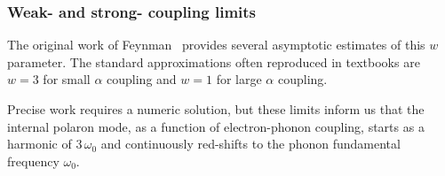 \subsubsection{Weak- and strong- coupling limits}
\label{subsubsec:2-2-2-1}

The original work of Feynman~\cite{feynman_slow_1955} provides several asymptotic estimates of this $w$ parameter. The standard approximations often reproduced in textbooks are $w=3$ for small $\alpha$ coupling and $w=1$ for large $\alpha$ coupling. 

Precise work requires a numeric solution, but these limits inform us that the internal polaron mode, as a function of electron-phonon coupling, starts as a harmonic of $3\,\omega_0$ and continuously red-shifts to the phonon fundamental frequency $\omega_0$.

